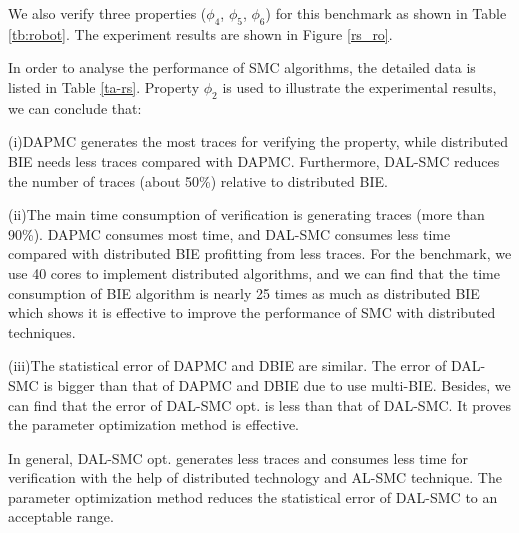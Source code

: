 We also verify three properties ($\phi_4$, $\phi_5$, $\phi_6$) for this benchmark as shown in Table \ref{tb:robot}. The experiment results are shown in Figure \ref{rs_ro}. 

In order to analyse the performance of SMC algorithms, the detailed data is listed in Table \ref{ta-rs}. Property $\phi_2$ is used to illustrate the experimental results, we can conclude that: 

(i)DAPMC generates the most traces for verifying the property, while distributed BIE needs less traces compared with DAPMC. Furthermore, DAL-SMC reduces the number of traces (about 50\%) relative to distributed BIE. 

(ii)The main time consumption of verification is generating traces (more than 90\%). DAPMC consumes most time, and DAL-SMC consumes less time compared with distributed BIE profitting from less traces. For the benchmark, we use 40 cores to implement distributed algorithms, and we can find that the time consumption of BIE algorithm is nearly 25 times as much as distributed BIE which shows it is effective to improve the performance of SMC with distributed techniques. 

(iii)The statistical error of DAPMC and DBIE are similar. The error of DAL-SMC is bigger than that of DAPMC and DBIE due to use multi-BIE. Besides, we can find that the error of DAL-SMC opt. is less than that of DAL-SMC. It proves the parameter optimization method is effective. 

In general, DAL-SMC opt. generates less traces and consumes less time for verification with the help of distributed technology and AL-SMC technique. The parameter optimization method reduces the statistical error of DAL-SMC to an acceptable range.

